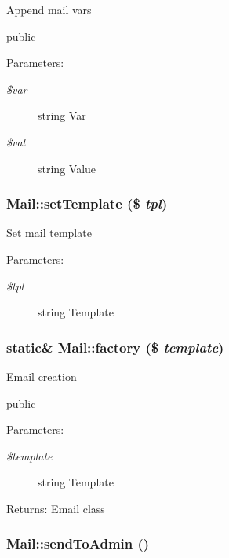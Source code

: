 Append mail vars

public \begin{Desc}
\item[Parameters:]
\begin{description}
\item[{\em \$var}]string Var \item[{\em \$val}]string Value \end{description}
\end{Desc}
\hypertarget{classMail_b346333471800d919fcf8723a92cf2f3}{
\subsubsection[setTemplate]{\setlength{\rightskip}{0pt plus 5cm}Mail::setTemplate (\$ {\em tpl})}}
\label{classMail_b346333471800d919fcf8723a92cf2f3}


Set mail template

\begin{Desc}
\item[Parameters:]
\begin{description}
\item[{\em \$tpl}]string Template \end{description}
\end{Desc}
\hypertarget{classMail_add43d8b5b8631aa3822123ea4ab201f}{
\subsubsection[factory]{\setlength{\rightskip}{0pt plus 5cm}static\& Mail::factory (\$ {\em template})}}
\label{classMail_add43d8b5b8631aa3822123ea4ab201f}


Email creation

public

\begin{Desc}
\item[Parameters:]
\begin{description}
\item[{\em \$template}]string Template \end{description}
\end{Desc}
\begin{Desc}
\item[Returns:]Email class \end{Desc}
\hypertarget{classMail_8b994926a2e68fcd287af87072b9206b}{
\subsubsection[sendToAdmin]{\setlength{\rightskip}{0pt plus 5cm}Mail::sendToAdmin ()}}
\label{classMail_8b994926a2e68fcd287af87072b9206b}


